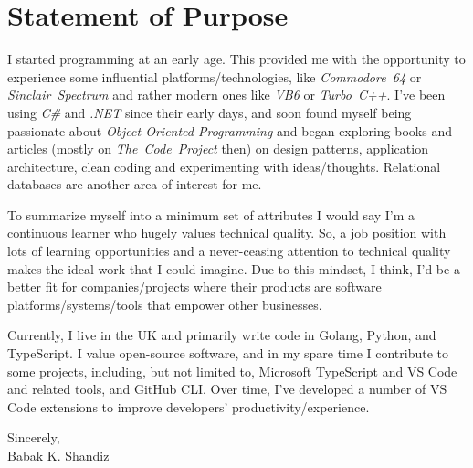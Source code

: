 \documentclass[9pt,a4paper]{extarticle}
\begin{document}


\section*{Statement of Purpose}

I started programming at an early age. This provided me with the opportunity
to experience some influential platforms/technologies, like
\textit{Commodore~64} or \textit{Sinclair~Spectrum} and rather modern ones
like \textit{VB6} or \textit{Turbo~C++}. I've been using \textit{C\#} and
\textit{.NET} since their early days, and soon found myself being passionate
about \textit{Object-Oriented Programming} and began exploring books and
articles (mostly on \textit{The~Code~Project} then) on design patterns,
application architecture, clean coding and experimenting with ideas/thoughts.
Relational databases are another area of interest for me.

To summarize myself into a minimum set of attributes I would say I'm a
continuous learner who hugely values technical quality. So, a job position with
lots of learning opportunities and a never-ceasing attention to technical
quality makes the ideal work that I could imagine. Due to this mindset, I think,
I'd be a better fit for companies/projects where their products are software
platforms/systems/tools that empower other businesses.

Currently, I live in the UK and primarily write code in Golang, Python, and
TypeScript. I value open-source software, and in my spare time I contribute to
some projects, including, but not limited to, Microsoft TypeScript and
VS Code and related tools, and GitHub CLI. Over time, I've developed a number
of VS Code extensions to improve developers' productivity/experience.

\vspace{2em}
\noindent
Sincerely, \\
\noindent
Babak K. Shandiz
\end{document}
